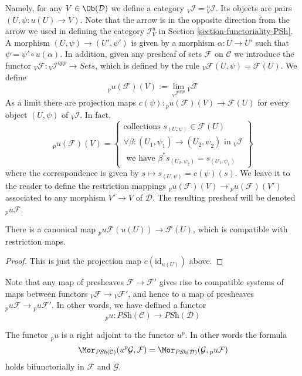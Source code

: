 \medskip\noindent
Namely, for any $V \in \Ob(\mathcal{D})$
we define a category ${}_V\mathcal{I} = {}_V^u\mathcal{I}$.
Its objects are pairs $(U, \psi : u(U) \to V)$.
Note that the arrow is in the opposite direction from the arrow
we used in defining the category $\mathcal{I}_V^u$ in
Section \ref{section-functoriality-PSh}.
A morphism $(U, \psi) \to (U', \psi')$ is given
by a morphism $\alpha : U \to U'$ such that
$\psi = \psi' \circ u(\alpha)$.
In addition, given any presheaf of sets $\mathcal{F}$
on $\mathcal{C}$ we introduce the functor
${}_V\mathcal{F} : {}_V\mathcal{I}^{opp} \to \textit{Sets}$,
which is defined by the rule
${}_V\mathcal{F}(U, \psi) = \mathcal{F}(U)$. We define
$$
{}_pu(\mathcal{F})(V) := \lim_{{}_V\mathcal{I}^{opp}} {}_V\mathcal{F}
$$
As a limit there are projection maps
$c(\psi) : {}_pu(\mathcal{F})(V) \to \mathcal{F}(U)$
for every object $(U, \psi)$ of ${}_V\mathcal{I}$.
In fact,
$$
{}_pu(\mathcal{F})(V)
=
\left\{
\begin{matrix}
\text{collections }
s_{(U, \psi)} \in \mathcal{F}(U) \\
\forall \beta : (U_1, \psi_1) \to (U_2, \psi_2)
\text{ in }{}_V\mathcal{I} \\
\text{ we have } \beta^*s_{(U_2, \psi_2)} = s_{(U_1, \psi_1)}
\end{matrix}
\right\}
$$
where the correspondence is given by $s \mapsto s_{(U, \psi)} = c(\psi)(s)$.
We leave it to the reader to define the restriction mappings
${}_pu(\mathcal{F})(V) \to {}_pu(\mathcal{F})(V')$
associated to any morphism $V' \to V$ of $\mathcal{D}$.
The resulting presheaf will be denoted ${}_pu\mathcal{F}$.

\begin{lemma}
\label{lemma-recover-pu}
There is a canonical map
${}_pu\mathcal{F}(u(U)) \to \mathcal{F}(U)$,
which is compatible with restriction maps.
\end{lemma}

\begin{proof}
This is just the projection map $c(\text{id}_{u(U)})$ above.
\end{proof}

\noindent
Note that any map of presheaves $\mathcal{F} \to \mathcal{F}'$
gives rise to compatible systems of maps between functors
${}_V\mathcal{F} \to {}_V\mathcal{F}'$, and hence to a map
of presheaves ${}_pu\mathcal{F} \to {}_pu\mathcal{F}'$. In other
words, we have defined a functor
$$
{}_pu :
\textit{PSh}(\mathcal{C})
\longrightarrow
\textit{PSh}(\mathcal{D})
$$

\begin{lemma}
\label{lemma-adjoints-pu}
The functor ${}_pu$ is a right adjoint to the functor $u^p$.
In other words the formula
$$
\Mor_{\textit{PSh}(\mathcal{C})}(u^p\mathcal{G}, \mathcal{F})
=
\Mor_{\textit{PSh}(\mathcal{D})}(\mathcal{G}, {}_pu\mathcal{F})
$$
holds bifunctorially in $\mathcal{F}$ and $\mathcal{G}$.
\end{lemma}

